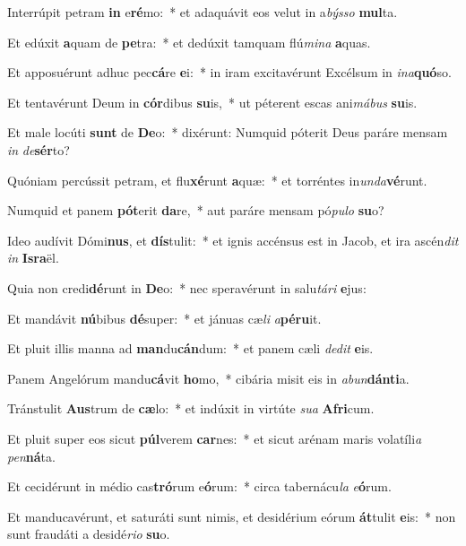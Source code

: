 \item Interrúpit petram \textbf{in} e\textbf{ré}mo:~* et adaquávit eos velut in a\textit{býs}\textit{so} \textbf{mul}ta.
\item Et edúxit \textbf{a}quam de \textbf{pe}tra:~* et dedúxit tamquam flú\textit{mi}\textit{na} \textbf{a}quas.
\item Et apposuérunt adhuc pec\textbf{cá}re \textbf{e}i:~* in iram excitavérunt Excélsum in \textit{in}\textit{a}\textbf{quó}so.
\item Et tentavérunt Deum in \textbf{cór}dibus \textbf{su}is,~* ut péterent escas ani\textit{má}\textit{bus} \textbf{su}is.
\item Et male locúti \textbf{sunt} de \textbf{De}o:~* dixérunt: Numquid póterit Deus paráre mensam \textit{in} \textit{de}\textbf{sér}to?
\item Quóniam percússit petram, et flu\textbf{xé}runt \textbf{a}quæ:~* et torréntes in\textit{un}\textit{da}\textbf{vé}runt.
\item Numquid et panem \textbf{pót}erit \textbf{da}re,~* aut paráre mensam pó\textit{pu}\textit{lo} \textbf{su}o?
\item Ideo audívit Dómi\textbf{nus}, et \textbf{dís}tulit:~* et ignis accénsus est in Jacob, et ira ascén\textit{dit} \textit{in} \textbf{Is}\textbf{ra}ël.
\item Quia non credi\textbf{dé}runt in \textbf{De}o:~* nec speravérunt in salu\textit{tá}\textit{ri} \textbf{e}jus:
\item Et mandávit \textbf{nú}bibus \textbf{dé}super:~* et jánuas cæ\textit{li} \textit{a}\textbf{pé}\textbf{ru}it.
\item Et pluit illis manna ad \textbf{man}du\textbf{cán}dum:~* et panem cæli \textit{de}\textit{dit} \textbf{e}is.
\item Panem Angelórum mandu\textbf{cá}vit \textbf{ho}mo,~* cibária misit eis in \textit{ab}\textit{un}\textbf{dán}\textbf{ti}a.
\item Tránstulit \textbf{Aus}trum de \textbf{cæ}lo:~* et indúxit in virtúte \textit{su}\textit{a} \textbf{A}\textbf{fri}cum.
\item Et pluit super eos sicut \textbf{púl}verem \textbf{car}nes:~* et sicut arénam maris volatíli\textit{a} \textit{pen}\textbf{ná}ta.
\item Et cecidérunt in médio cas\textbf{tró}rum e\textbf{ó}rum:~* circa tabernácu\textit{la} \textit{e}\textbf{ó}rum.
\item Et manducavérunt, et saturáti sunt nimis, et desidérium eórum \textbf{át}tulit \textbf{e}is:~* non sunt fraudáti a desidé\textit{ri}\textit{o} \textbf{su}o.
